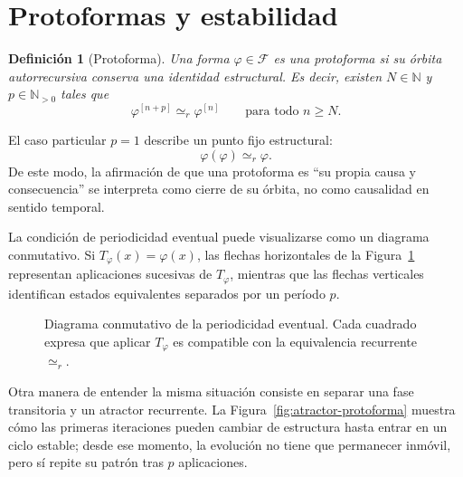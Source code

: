 \documentclass[11pt]{article}
\numberwithin{equation}{section}
\theoremstyle{prism}
\newtheorem{definicion}{Definición}
\newcommand{\F}{\mathcal{F}}
\newcommand{\N}{\mathbb{N}}
\newcommand{\iter}[2]{#1^{[#2]}}
\newcommand{\peq}{\simeq_{\!r}}
\begin{document}
\section{Protoformas y estabilidad}

\begin{definicion}[Protoforma]
Una forma $\varphi\in\F$ es una \emph{protoforma} si su órbita autorrecursiva
conserva una identidad estructural. Es decir, existen $N\in\N$ y
$p\in\N_{>0}$ tales que
\begin{equation}
  \iter{\varphi}{n+p}\peq\iter{\varphi}{n}
  \qquad\text{para todo }n\geq N.
  \label{eq:protoforma}
\end{equation}
\end{definicion}

El caso particular $p=1$ describe un punto fijo estructural:
\[
  \varphi(\varphi)\peq\varphi.
\]
De este modo, la afirmación de que una protoforma es ``su propia causa y
consecuencia'' se interpreta como cierre de su órbita, no como causalidad en
sentido temporal.

La condición de periodicidad eventual puede visualizarse como un diagrama
conmutativo. Si $T_{\varphi}(x)=\varphi(x)$, las flechas horizontales de la
Figura~\ref{fig:diagrama-protoforma} representan aplicaciones sucesivas de
$T_{\varphi}$, mientras que las flechas verticales identifican estados
equivalentes separados por un período $p$.

\begin{figure}[htbp]
  \centering
  \caption{Diagrama conmutativo de la periodicidad eventual. Cada cuadrado
  expresa que aplicar $T_{\varphi}$ es compatible con la equivalencia
  recurrente $\simeq_r$.}
  \label{fig:diagrama-protoforma}
\end{figure}

Otra manera de entender la misma situación consiste en separar una fase
transitoria y un atractor recurrente. La Figura~\ref{fig:atractor-protoforma}
muestra cómo las primeras iteraciones pueden cambiar de estructura hasta entrar
en un ciclo estable; desde ese momento, la evolución no tiene que permanecer
inmóvil, pero sí repite su patrón tras $p$ aplicaciones.
\end{document}

